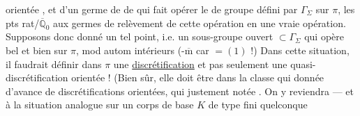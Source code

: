 orientée ,
et d'un germe de 
de
\unsure{)|,}
qui fait opérer  le  de groupe
défini par $\Gamma_{\Sigma}$ sur $\pi$, les pts rat/$\overline{\mathbb Q}_0$
 aux
 germes de relèvement de
cette opération\unsure{,}  en une vraie opération.
Supposons donc donné un tel point, i.e.
  un sous-groupe ouvert
$\subset\Gamma_{\Sigma}$
qui opère bel et bien sur $\pi$,
 mod autom intérieurs
(-$\overline{\mathrm m}$ 
car \unsure{$\pi^{\Gamma}$|$\overline\pi^{\Gamma}$}$=(1)$ !)
Dans cette situation, il faudrait définir dans $\pi$
une \uline{discrétification}
et pas seulement une quasi-discrétification orientée !
 (Bien sûr, elle doit être dans la classe qui  donnée d'avance
de  discrétifications orientées, qui 
justement notée .
On y reviendra --- et à la situation analogue sur un corps de
base $K$ de type fini quelconque


